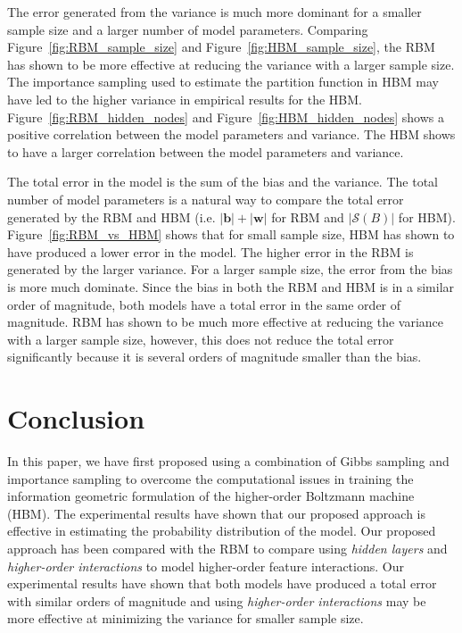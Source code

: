 \documentclass[letterpaper]{article} %
\begin{document}
        The error generated from the variance is much more dominant for a smaller sample size and a larger number of model parameters. Comparing Figure~\ref{fig:RBM_sample_size} and Figure~\ref{fig:HBM_sample_size}, the RBM has shown to be more effective at reducing the variance with a larger sample size. The importance sampling used to estimate the partition function in HBM may have led to the higher variance in empirical results for the HBM.
        Figure~\ref{fig:RBM_hidden_nodes} and Figure~\ref{fig:HBM_hidden_nodes} shows a positive correlation between the model parameters and variance. The HBM shows to have a larger correlation between the model parameters and variance.
        
        The total error in the model is the sum of the bias and the variance. The total number of model parameters is a natural way to compare the total error generated by the RBM and HBM (i.e. $\left| \mathbf{b} \right| + \left| \mathbf{w} \right|$ for RBM  and $\left| \mathcal{S} \left( B \right) \right|$ for HBM). Figure~\ref{fig:RBM_vs_HBM} shows that for small sample size, HBM has shown to have produced a lower error in the model. The higher error in the RBM is generated by the larger variance. For a larger sample size, the error from the bias is more much dominate. Since the bias in both the RBM and HBM is in a similar order of magnitude, both models have a total error in the same order of magnitude. RBM has shown to be much more effective at reducing the variance with a larger sample size, however, this does not reduce the total error significantly because it is several orders of magnitude smaller than the bias.

\section{Conclusion} \label{sec:conclusion}
	In this paper, we have first proposed using a combination of Gibbs sampling and importance sampling to overcome the computational issues in training the information geometric formulation of the higher-order Boltzmann machine (HBM). The experimental results have shown that our proposed approach is effective in estimating the probability distribution of the model. Our proposed approach has been compared with the RBM to compare using \textit{hidden layers} and \textit{higher-order interactions} to model higher-order feature interactions. Our experimental results have shown that both models have produced a total error with similar orders of magnitude and using \textit{higher-order interactions} may be more effective at minimizing the variance for smaller sample size.



\end{document}
